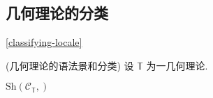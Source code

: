 \subsection{几何理论的分类\topos{}}

\ref{classifying-locale}

\begin{definition}
    {(几何理论的语法景和分类\topos{})}
    设 $\mathbb T$ 为一几何理论.
    
    $\text{Sh}(\mathcal C_{\mathbb T},)$
\end{definition}

